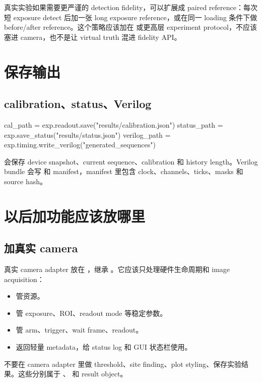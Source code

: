\documentclass[11pt,oneside,openany]{book}
\begin{document}
\begin{notebox}[后续更严格的策略]
真实实验如果需要更严谨的 detection fidelity，可以扩展成 paired reference：每次短 exposure detect 后加一张 long exposure reference，或在同一 loading 条件下做 before/after reference。这个策略应该加在  或更高层 experiment protocol，不应该塞进 camera，也不是让 virtual truth 混进 fidelity API。
\end{notebox}

\chapter{保存输出}
\section{calibration、status、Verilog}
\begin{codeblock}[Python]
cal_path = exp.readout.save("results/calibration.json")
status_path = exp.save_status("results/status.json")
verilog_path = exp.timing.write_verilog("generated_sequences")
\end{codeblock}

 会保存 device snapshot、current sequence、calibration 和 history length。Verilog bundle 会写  和 manifest，manifest 里包含 clock、channels、ticks、masks 和 source hash。

\chapter{以后加功能应该放哪里}
\section{加真实 camera}
真实 camera adapter 放在 ，继承 。它应该只处理硬件生命周期和 image acquisition：
\begin{itemize}
  \item {} 管资源。
  \item {} 管 exposure、ROI、readout mode 等稳定参数。
  \item {} 管 arm、trigger、wait frame、readout。
  \item {} 返回轻量 metadata，给 status log 和 GUI 状态栏使用。
\end{itemize}
不要在 camera adapter 里做 threshold、site finding、plot styling、保存实验结果。这些分别属于 、 和 result object。
\end{document}
